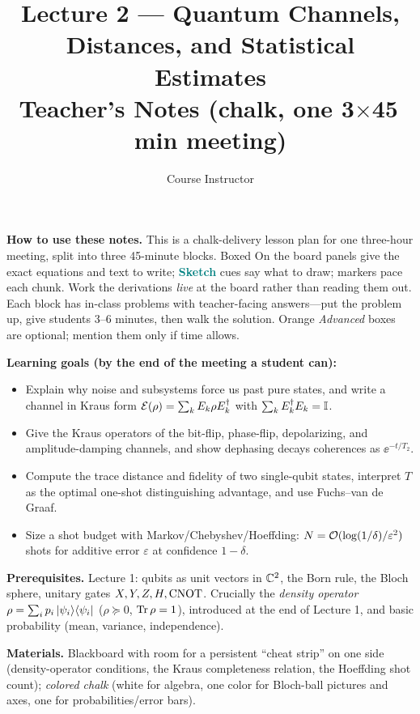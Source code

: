 \documentclass[11pt]{article}
\title{\textbf{Lecture 2 --- Quantum Channels, Distances, and Statistical Estimates}\\[0.3em]\large Teacher's Notes (chalk, one 3$\times$45\,min meeting)}
\author{Course Instructor}
\date{}
\begin{document}
\maketitle

\noindent\textbf{How to use these notes.} This is a chalk-delivery lesson plan for
one three-hour meeting, split into three 45-minute blocks. Boxed \textsf{On the
board} panels give the exact equations and text to write; \textcolor{teal}{\textbf{Sketch}}
cues say what to draw;  markers pace each chunk. Work the derivations
\emph{live} at the board rather than reading them out. Each block has in-class
problems with teacher-facing answers---put the problem up, give students 3--6
minutes, then walk the solution. Orange \emph{Advanced} boxes are optional; mention
them only if time allows.

\medskip
\noindent\textbf{Learning goals (by the end of the meeting a student can):}
\begin{itemize}[leftmargin=1.4em,nosep]
  \item Explain why noise and subsystems force us past pure states, and write a channel in Kraus form $\mathcal E(\rho)=\sum_k E_k\rho E_k^{\dagger}$ with $\sum_k E_k^{\dagger} E_k=\mathbb{I}$.
  \item Give the Kraus operators of the bit-flip, phase-flip, depolarizing, and amplitude-damping channels, and show dephasing decays coherences as $\ee^{-t/T_2}$.
  \item Compute the trace distance and fidelity of two single-qubit states, interpret $T$ as the optimal one-shot distinguishing advantage, and use Fuchs--van de Graaf.
  \item Size a shot budget with Markov/Chebyshev/Hoeffding: $N=\mathcal{O}(\log(1/\delta)/\varepsilon^2)$ shots for additive error $\varepsilon$ at confidence $1-\delta$.
\end{itemize}

\medskip
\noindent\textbf{Prerequisites.} Lecture 1: qubits as unit vectors in $\mathbb{C}^2$, the
Born rule, the Bloch sphere, unitary gates $X,Y,Z,H,\mathrm{CNOT}$. Crucially the
\emph{density operator} $\rho=\sum_i p_i\ket{\psi_i}\!\bra{\psi_i}$ ($\rho\succeq0$, $\operatorname{Tr}\rho=1$),
introduced at the end of Lecture 1, and basic probability (mean, variance,
independence).

\medskip
\noindent\textbf{Materials.} Blackboard with room for a persistent ``cheat strip''
on one side (density-operator conditions, the Kraus completeness relation, the
Hoeffding shot count); \emph{colored chalk} (white for algebra, one color for
Bloch-ball pictures and axes, one for probabilities/error bars).
\end{document}
